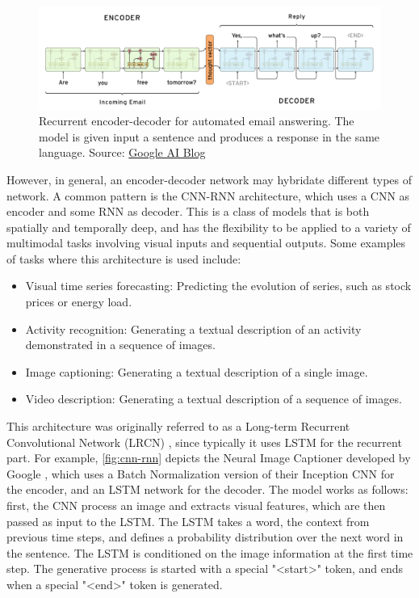 \begin{figure}[hpt]
	\centering
	\includegraphics[scale=0.3]{images/ch3/rnn-rnn.png}
	\caption{Recurrent encoder-decoder for automated email answering. The model is given input a sentence and produces a response in the same language. Source: \href{https://ai.googleblog.com/2015/11/computer-respond-to-this-email.html}{Google AI Blog}}
	\label{fig:rnn-rnn}
\end{figure}

However, in general, an encoder-decoder network may hybridate different types of network. A common pattern is the CNN-RNN architecture, which uses a CNN as encoder and some RNN as decoder. This is a class of models that is both spatially and temporally deep, and has the flexibility to be applied to a variety of multimodal tasks involving visual inputs and sequential outputs. Some examples of tasks where this architecture is used include:

\begin{itemize}
    \item Visual time series forecasting: Predicting the evolution of series, such as stock prices or energy load.
    \item Activity recognition: Generating a textual description of an activity demonstrated in a sequence of images.
    \item Image captioning: Generating a textual description of a single image.
    \item Video description: Generating a textual description of a sequence of images.
\end{itemize}

This architecture was originally referred to as a Long-term Recurrent Convolutional Network (LRCN) \citep{Donahue2015}, since typically it uses LSTM for the recurrent part. For example, \cref{fig:cnn-rnn} depicts the Neural Image Captioner developed by Google \citep{Vinyals2015}, which uses  a Batch Normalization version of their Inception CNN for the encoder, and an LSTM network for the decoder. The model works as follows: first, the CNN process an image and extracts visual features, which are then passed as input to the LSTM. The LSTM takes a word, the context from previous time steps, and defines a probability distribution over the next word in the sentence. The LSTM is conditioned on the image information at the first time step. The generative process is started with a special "<start>" token, and ends when a special "<end>" token is generated.

